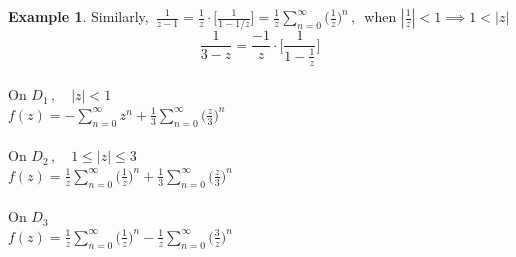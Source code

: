 \documentclass[11pt,a4paper]{article}
\theoremstyle{definition}
\newtheorem{example}[thm]{Example}
\begin{document}
\begin{example}
Similarly, $\,\displaystyle{\frac{1}{z - 1} = \frac{1}{z}\cdot\Big[\frac{1}{1 - 1/z}\Big] = \frac{1}{z}\sum^{\infty}_{n = 0}\Big(\frac{1}{z}\Big)^n}\,,\,$ when $\left|\frac{1}{z}\right|< 1\implies 1 < \left|z\right|$\\



$$\frac{1}{3 - z} = \frac{-1}{z}\cdot \Bigg[ \frac{1}{1 - \frac{1}{z}}\Bigg]$$\\


On $D_1\,,\quad  \left|z\right| < 1$\\
$\displaystyle{f(z)  = - \sum^{\infty}_{n = 0}z^n + \frac{1}{3}\sum^{\infty}_{n  = 0} \Big(\frac{z}{3}\Big)^n}$\\\\


On $D_2\,, \quad  1\leq\left|z\right|\leq 3$\\
$\displaystyle{f(z)  = \frac{1}{z}\sum^{\infty}_{n = 0} \Big(\frac{1}{z}\Big)^n + \frac{1}{3}\sum^{\infty}_{n = 0}\Big(\frac{z}{3}\Big)^n}$\\\\

On $D_3$\\
$\displaystyle{f(z) = \frac{1}{z}\sum^{\infty}_{n = 0} \Big(\frac{1}{z}\Big)^n - \frac{1}{z}\sum^{\infty}_{n = 0} \Big(\frac{3}{z}\Big)^n}$
\end{example}
\end{document}
